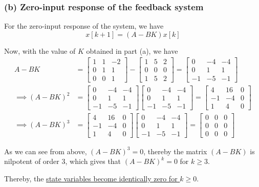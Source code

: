 \subsubsection*{(b) Zero-input response of the feedback system}

For the zero-input response of the system, we have
\begin{equation*}
    x[k+1] = (A - BK) x[k]
\end{equation*}

Now, with the value of \( K \) obtained in part (a), we have
\begin{align*}
    A - BK
     & =
    \begin{bmatrix}
        1 & 1 & -2 \\
        0 & 1 & 1  \\
        0 & 0 & 1
    \end{bmatrix}
    -
    \begin{bmatrix}
        1 & 5 & 2 \\
        0 & 0 & 0 \\
        1 & 5 & 2
    \end{bmatrix}
    =
    \begin{bmatrix}
        0  & -4 & -4 \\
        0  & 1  & 1  \\
        -1 & -5 & -1
    \end{bmatrix}
    \\
    \implies
    (A - BK)^2
     & =
    \begin{bmatrix}
        0  & -4 & -4 \\
        0  & 1  & 1  \\
        -1 & -5 & -1
    \end{bmatrix}
    \begin{bmatrix}
        0  & -4 & -4 \\
        0  & 1  & 1  \\
        -1 & -5 & -1
    \end{bmatrix}
    =
    \begin{bmatrix}
        4  & 16 & 0 \\
        -1 & -4 & 0 \\
        1  & 4  & 0
    \end{bmatrix}
    \\
    \implies
    (A - BK)^3
     & =
    \begin{bmatrix}
        4  & 16 & 0 \\
        -1 & -4 & 0 \\
        1  & 4  & 0
    \end{bmatrix}
    \begin{bmatrix}
        0  & -4 & -4 \\
        0  & 1  & 1  \\
        -1 & -5 & -1
    \end{bmatrix}
    =
    \begin{bmatrix}
        0 & 0 & 0 \\
        0 & 0 & 0 \\
        0 & 0 & 0
    \end{bmatrix}
\end{align*}

As we can see from above, \( {(A - BK)}^3 = 0 \), thereby the matrix \( (A - BK) \) is nilpotent of order 3, which gives that \( {(A - BK)}^k = 0 \) for \( k \geq 3 \).

Thereby, the \underline{state variables become identically zero for \( k \geq 0 \)}.
